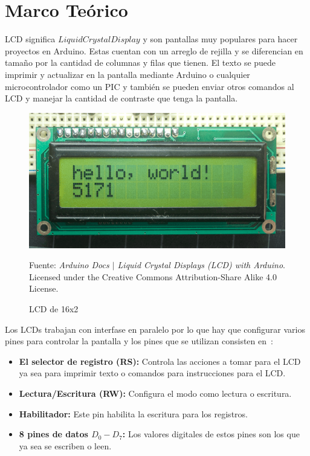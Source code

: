 \documentclass{article}
\begin{document}
    \section{Marco Teórico}\label{sec:marco-teórico}

    LCD significa $Liquid Crystal Display$ y son pantallas muy populares para
    hacer proyectos en Arduino. Estas cuentan con un arreglo de rejilla y se
    diferencian en tamaño por la cantidad de columnas y filas que tienen. El
    texto se puede imprimir y actualizar en la pantalla mediante Arduino o
    cualquier microcontrolador como un PIC y también se pueden enviar otros
    comandos al LCD y manejar la cantidad de contraste que tenga la pantalla.

    \begin{figure}[H]
        \centering
        \includegraphics[width=0.3\paperwidth]{images/lcd-photo}
        \caption{LCD de 16x2}\footnotesize
        Fuente: \textit{Arduino Docs $\mid$ Liquid Crystal Displays (LCD)
            with Arduino}. Licensed under the Creative Commons
        Attribution-Share Alike 4.0 License.~\cite{arduino-docs-lcd-2021}\label{fig:figure}
    \end{figure}

    Los LCDs trabajan con interfase en paralelo por lo que hay que configurar
    varios pines para controlar la pantalla y los pines que se utilizan
    consisten en~\cite{arduino-docs-lcd-2021}:

    \begin{itemize}
        \item \textbf{El selector de registro (RS):} Controla las acciones a
        tomar para el LCD ya sea para imprimir texto o comandos para
        instrucciones para el LCD.
        \item \textbf{Lectura/Escritura (RW):} Configura el modo como lectura
        o escritura.
        \item \textbf{Habilitador:} Este pin habilita la escritura para los
        registros.
        \item \textbf{8 pines de datos $D_0-D_7$:} Los valores digitales de
        estos pines son los que ya sea se escriben o leen.
    \end{itemize}
\end{document}
